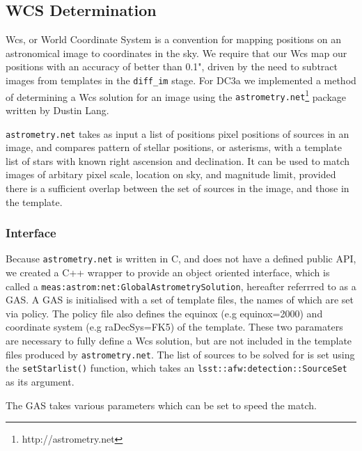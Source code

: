 
\subsection{WCS Determination}

Wcs, or World Coordinate System is a convention for mapping positions on an astronomical image to coordinates in the sky. We require that our Wcs map our positions with an accuracy of better than 0.1", driven by the need to subtract images from templates in the {\tt diff\_im} stage. For DC3a we implemented a method of determining a Wcs solution for an image using the {\tt astrometry.net}\footnote{http://astrometry.net} package written by Dustin Lang. 

{\tt astrometry.net} takes as input a list of positions pixel positions of sources in an image, and compares pattern of stellar positions, or asterisms, with a template list of stars with known right ascension and declination. It can be used to match images of arbitary pixel scale, location on sky, and magnitude limit, provided there is a sufficient overlap between the set of sources in the image, and those in the template. 

\subsubsection{Interface}
Because {\tt astrometry.net} is written in C, and does not have a defined public API, we created a C++ wrapper to provide an object oriented interface, which is called a {\tt meas:astrom:net:GlobalAstrometrySolution}, hereafter referrred to as a GAS. A GAS is initialised with a set of template files, the names of which are set via policy. The policy file also defines the equinox (e.g equinox=2000) and coordinate system (e.g raDecSys=FK5) of the template. These two paramaters are necessary to fully define a Wcs solution, but are not included in the template files produced by {\tt astrometry.net}. The list of sources to be solved for is set using the {\tt setStarlist()} function, which takes an {\tt lsst::afw:detection::SourceSet} as its argument.


The GAS takes various parameters which can be set to speed the match. 

